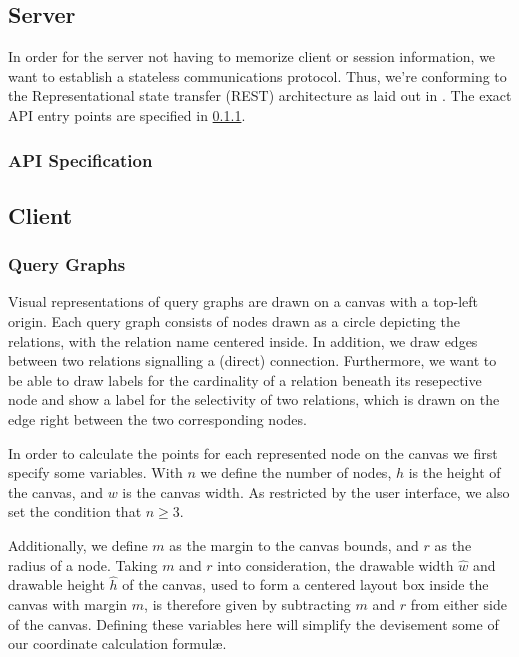 \subsection{Server}

In order for the server not having to memorize client or session information, we want to establish a stateless communications protocol.
Thus, we're conforming to the Representational state transfer (REST) architecture as laid out in \cite{fielding2000architectural}.
The exact API entry points are specified in \ref{sub:api-entry-points}.

\subsubsection{API Specification}
\label{sub:api-entry-points}

\subsection{Client}

\subsubsection{Query Graphs}
\label{subsub:query-graphs}

Visual representations of query graphs are drawn on a canvas with a top-left origin. Each query graph consists of nodes drawn as a circle depicting the relations, with the relation name centered inside. In addition, we draw edges  between two relations signalling a (direct) connection. Furthermore, we want to be able to draw labels for the cardinality of a relation beneath its resepective node and show a label for the selectivity of two relations, which is drawn on the edge right between the two corresponding nodes.

In order to calculate the points for each represented node on the canvas we first specify some variables.
With $n$ we define the number of nodes, $h$ is the height of the canvas, and $w$ is the canvas width. 
As restricted by the user interface, we also set the condition that $n \geq 3$.

Additionally, we define $m$ as the margin to the canvas bounds, and $r$ as the radius of a node.
Taking $m$ and $r$ into consideration, the drawable width $\hat{w}$ and drawable height $\hat{h}$ of the canvas, used to form a centered layout box inside the canvas with margin $m$, is therefore given by subtracting $m$ and $r$ from either side of the canvas. Defining these variables here will simplify the devisement some of our coordinate calculation formul\ae.

